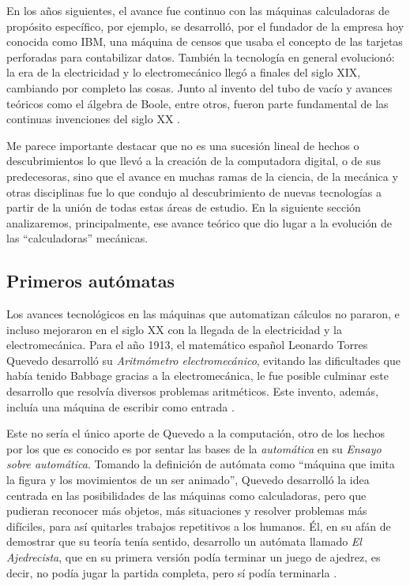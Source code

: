 \documentclass[letterpaper,12pt,oneside]{book}
\begin{document}
		En los años siguientes, el avance fue continuo con las máquinas calculadoras de propósito específico, por ejemplo, se desarrolló, por el fundador de la empresa hoy conocida como IBM,
		  una máquina de censos que usaba el concepto de las tarjetas perforadas para
        contabilizar datos. También la tecnología en general evolucionó:
		la era de la electricidad y lo electromecánico llegó a finales del siglo XIX, cambiando por completo las cosas. Junto al invento del tubo de vacío y avances teóricos como el álgebra de Boole, entre otros, fueron parte fundamental de las continuas invenciones del siglo XX \cite[p. 127]{ifrah_universal_2001}.
  
        Me parece importante destacar que no es una sucesión lineal de hechos o descubrimientos
		lo que llevó a la creación de la computadora digital, o de sus predecesoras, sino que el avance en muchas ramas de la ciencia, de la mecánica y otras
		disciplinas fue lo que condujo al descubrimiento de nuevas tecnologías a partir de la unión de todas estas áreas de estudio. En la siguiente sección analizaremos, principalmente, ese avance teórico que dio lugar a la evolución de las ``calculadoras'' mecánicas.
		

		\clearpage		
		\subsection{Primeros autómatas}
		
		Los avances tecnológicos en las máquinas que automatizan cálculos no pararon, e incluso mejoraron en el siglo XX con la llegada de la electricidad
		y la electromecánica. Para el año 1913, el matemático español Leonardo Torres Quevedo desarrolló su \textit{Aritmómetro electromecánico}, evitando las
		dificultades que había tenido Babbage gracias a la electromecánica, le fue posible culminar este desarrollo que resolvía diversos
		problemas aritméticos. Este invento, además, incluía una máquina de escribir como entrada \cite{museo_torres_quevedo_ajedrecista_nodate,ifrah_universal_2001}.
  
        Este no sería el único aporte de Quevedo
		a la computación, otro de los hechos por los que es conocido es por sentar las bases de la \textit{automática} en su \textit{Ensayo sobre automática}.
		Tomando
		la definición de autómata como ``máquina que imita la figura y los movimientos de un ser animado'', Quevedo desarrolló la idea centrada en las posibilidades
		de las máquinas como calculadoras, pero que pudieran reconocer más objetos, más situaciones y resolver problemas más difíciles, para así
		quitarles trabajos repetitivos a los humanos. Él, en su afán de demostrar que su teoría tenía sentido, desarrollo un autómata llamado
		\textit{El Ajedrecista}, que en su primera versión podía terminar un juego de ajedrez, es decir, no podía jugar la partida completa,
		pero sí podía terminarla \cite{museo_torres_quevedo_ajedrecista_nodate,ifrah_universal_2001}.
		
\end{document}
